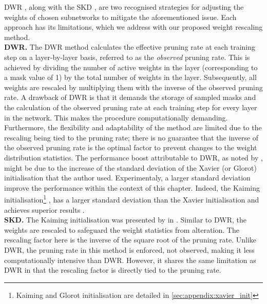 \acf{DWR} \cite{DBLP:conf/nips/ZhouLLY19}, along with the \ac{SKD}
\cite{DBLP:conf/cvpr/RamanujanWKFR20}, are two recognised strategies for
adjusting the weights of chosen subnetworks to mitigate the aforementioned
issue. Each approach has its limitations, which we address with our proposed
weight rescaling method.\\

\noindent\textbf{ \acl{DWR}.} The \ac{DWR} \cite{DBLP:conf/nips/ZhouLLY19}
method calculates the effective pruning rate at each training step on a
layer-by-layer basis, referred to as the \emph{observed} pruning rate. This is
achieved by dividing the number of active weights in the layer (corresponding to
a mask value of 1) by the total number of weights in the layer. Subsequently,
all weights are rescaled by multiplying them with the inverse of the observed
pruning rate. A drawback of \ac{DWR} is that it demands the storage of sampled
masks and the calculation of the observed pruning rate at each training step for
every layer in the network. This makes the procedure computationally demanding.
Furthermore, the flexibility and adaptability of the method are limited due to
the rescaling being tied to the pruning rate; there is no guarantee that the
inverse of the observed pruning rate is the optimal factor to prevent changes to
the weight distribution statistics. The performance boost attributable to
\ac{DWR}, as noted by \citeauthor{DBLP:conf/nips/ZhouLLY19}, might be due to the
increase of the standard deviation of the Xavier (or Glorot) initialisation
\cite{glorot2011deep} that the author used. Experimentaly, a larger standard
deviation improve the performance within the context of this chapter. Indeed,
the Kaiming initialisation\footnote{Kaiming and Glorot initialisation are
detailed in \cref{sec:appendix:xavier_init}} \cite{DBLP:conf/cvpr/HeZRS16}, has
a larger standard deviation than the Xavier initialisation and achieves superior
results
\cite{DBLP:conf/cvpr/RamanujanWKFR20,DBLP:journals/corr/abs-2202-12002}.\\

\noindent\textbf{\acl{SKD}.} The Kaiming initialisation
\cite{DBLP:conf/cvpr/HeZRS16} was presented by
\citeauthor{DBLP:conf/cvpr/RamanujanWKFR20} in
\cite{DBLP:conf/cvpr/RamanujanWKFR20}. Similar to \ac{DWR}, the weights are
rescaled to safeguard the weight statistics from alteration. The rescaling
factor here is the inverse of the square root of the pruning rate. Unlike
\ac{DWR}, the pruning rate in this method is enforced, not observed, making it
less computationally intensive than \ac{DWR}. However, it shares the same
limitation as \ac{DWR} in that the rescaling factor is directly tied to the
pruning rate.\\

